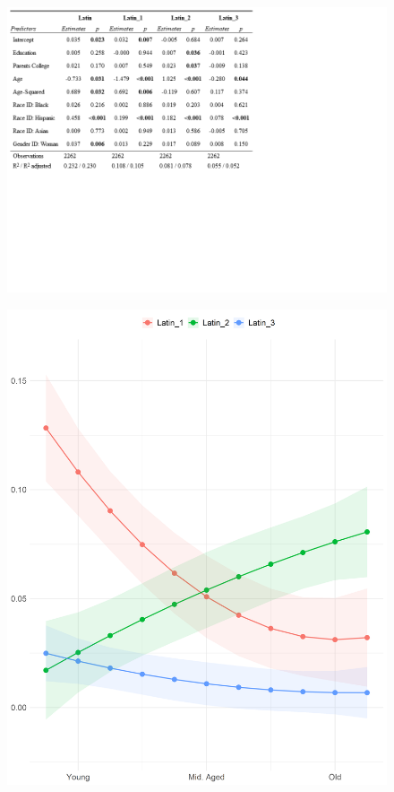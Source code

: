 \documentclass[a4paper,12pt]{extarticle}
\begin{document}
\begin{figure}[ht!]
    \centering    
    \includegraphics[width=1.5\textwidth]{Tabs/reg-tab-latin.png}
    \caption{}
    \label{tab:reg-metal}
\end{figure}

\begin{figure}[ht!]
    \centering    \includegraphics[width=1.0\textwidth]{Plots/Demog/micro-by-age-latin.png}
    \caption{}
    \label{fig:age-salsa}
\end{figure}
\end{document}
